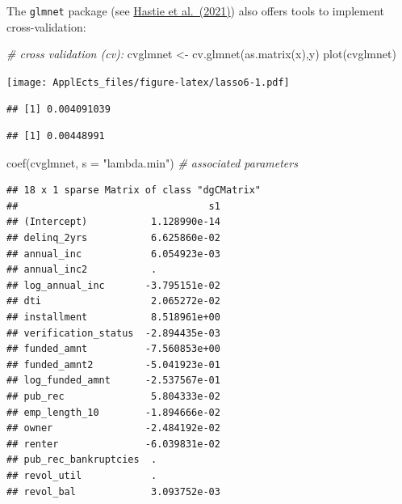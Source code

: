 \documentclass[
  12pt,
]{book}
\newenvironment{Shaded}{\begin{snugshade}}{\end{snugshade}}
\newcommand{\AttributeTok}[1]{\textcolor[rgb]{0.77,0.63,0.00}{#1}}
\newcommand{\CommentTok}[1]{\textcolor[rgb]{0.56,0.35,0.01}{\textit{#1}}}
\newcommand{\FloatTok}[1]{\textcolor[rgb]{0.00,0.00,0.81}{#1}}
\newcommand{\FunctionTok}[1]{\textcolor[rgb]{0.00,0.00,0.00}{#1}}
\newcommand{\NormalTok}[1]{#1}
\newcommand{\OtherTok}[1]{\textcolor[rgb]{0.56,0.35,0.01}{#1}}
\newcommand{\SpecialCharTok}[1]{\textcolor[rgb]{0.00,0.00,0.00}{#1}}
\newcommand{\StringTok}[1]{\textcolor[rgb]{0.31,0.60,0.02}{#1}}
\theoremstyle{definition}
\theoremstyle{definition}
\theoremstyle{definition}
\theoremstyle{definition}
\theoremstyle{remark}
\begin{document}
The \texttt{glmnet} package (see \href{https://glmnet.stanford.edu/articles/glmnet.html}{Hastie et al.~(2021)}) also offers tools to implement cross-validation:

\begin{Shaded}
\begin{Highlighting}[]
\CommentTok{\# cross validation (cv):}
\NormalTok{cvglmnet }\OtherTok{\textless{}{-}} \FunctionTok{cv.glmnet}\NormalTok{(}\FunctionTok{as.matrix}\NormalTok{(x),y)}
\FunctionTok{plot}\NormalTok{(cvglmnet)}
\end{Highlighting}
\end{Shaded}

\texttt{[image: ApplEcts\_files/figure-latex/lasso6-1.pdf]}

\begin{Shaded}
\end{Shaded}

\begin{verbatim}
## [1] 0.004091039
\end{verbatim}

\begin{Shaded}
\end{Shaded}

\begin{verbatim}
## [1] 0.00448991
\end{verbatim}

\begin{Shaded}
\begin{Highlighting}[]
\FunctionTok{coef}\NormalTok{(cvglmnet, }\AttributeTok{s =} \StringTok{"lambda.min"}\NormalTok{) }\CommentTok{\# associated parameters}
\end{Highlighting}
\end{Shaded}

\begin{verbatim}
## 18 x 1 sparse Matrix of class "dgCMatrix"
##                                 s1
## (Intercept)           1.128990e-14
## delinq_2yrs           6.625860e-02
## annual_inc            6.054923e-03
## annual_inc2           .           
## log_annual_inc       -3.795151e-02
## dti                   2.065272e-02
## installment           8.518961e+00
## verification_status  -2.894435e-03
## funded_amnt          -7.560853e+00
## funded_amnt2         -5.041923e-01
## log_funded_amnt      -2.537567e-01
## pub_rec               5.804333e-02
## emp_length_10        -1.894666e-02
## owner                -2.484192e-02
## renter               -6.039831e-02
## pub_rec_bankruptcies  .           
## revol_util            .           
## revol_bal             3.093752e-03
\end{verbatim}
\end{document}
